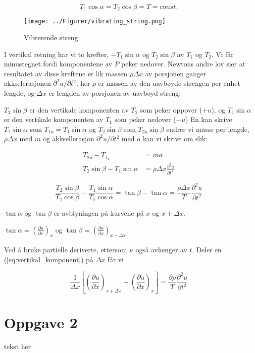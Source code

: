 \documentclass[12pt, a4paper, leqno]{article}
\begin{document}
\begin{equation}
  T_1 \cos\alpha = T_2 \cos\beta = T = const.
  \label{eq:konst_T}
\end{equation}

\begin{figure}[h]
  \centering
  \texttt{[image: ../Figurer/vibrating\_string.png]}
  \caption{Vibrerende streng} 
\end{figure}

I vertikal retning har vi to krefter, $-T_1 \sin\alpha$ og $T_2 \sin\beta$ av $T_1$ og $T_2$. Vi får 
minustegnet fordi komponentene av $P$ peker nedover. Newtons andre lov sier at resultatet av disse 
kreftene er lik massen $\rho\Delta x$ av porsjonen ganger akkselerasjonen $\partial ^2 u / \partial t^2$;
her $\rho$ er massen av den uavbøyde strengen per enhet lengde, og $\Delta x$ er lengden av porsjonen
av uavbøyd streng.

$T_2 \sin\beta$ er den vertikale komponenten av $T_2$ som peker oppover ($+u$), og $T_1 \sin\alpha$ er den
vertikale komponenten av $T_1$ som peker nedover ($-u$) En kan skrive $T_1 \sin\alpha$ som $T_{1 u} = T_1 \sin\alpha$
og $T_2 \sin\beta$ som $T_{2 u} \sin\beta$ endrer vi masse per lengde, $\rho \Delta x$ med $m$ og akksellerasjon
$\partial^2 u / \partial t^2$ med $a$ kan vi skrive om  slik:

\begin{align*}
  T_{2 u} - T_{1_u} &= ma \\
  T_2 \sin\beta - T_1 \sin\alpha &= \rho \Delta x \frac{\partial ^2 u}{\partial t^2}
\end{align*}

\begin{equation}
  \frac{T_2 \sin\beta}{T_2 \cos\beta} - \frac{T_1 \sin\alpha}{T_1 \cos\alpha} = 
  \tan{\beta} - \tan{\alpha} = \frac{\rho \Delta x}{T} \frac{\partial^2 u}{\partial t^2}
\label{eq:vertikal_komponent}
\end{equation}

$\tan \alpha$ og $\tan \beta$ er avblyningen på kurvene på $x$ og $x + \Delta x$.

\begin{center}
  $\tan \alpha =  {(\frac{\partial u}{\partial x})}_x$ og $\tan \beta = {(\frac{\partial u}{\partial x})}_{x + \Delta x}$.
\end{center}

Ved å bruke partielle deriverte, ettersom $u$ også avhenger av $t$. Deler en (\ref{eq:vertikal_komponent}) på $\Delta x$ får vi

\begin{equation*}
  \frac{1}{\Delta x} \left[ {\left( \frac{\partial u}{\partial x} \right)}_{x + \Delta x}
  - { \left( \frac{\partial u}{\partial x} \right) }_x \right]
  = \frac{\partial \rho}{T} \frac{\partial^2 u}{\partial t^2}
\end{equation*}
\section{Oppgave 2}

tekst her 
\end{document}

